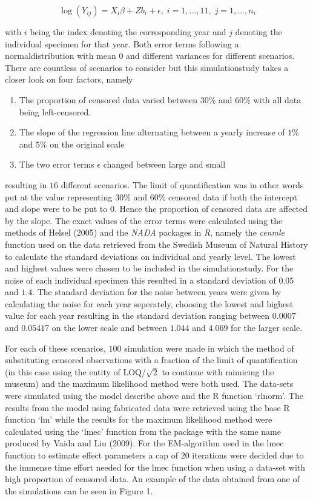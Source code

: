 \documentclass[]{article}
\providecommand{\tightlist}{%
  \setlength{\itemsep}{0pt}\setlength{\parskip}{0pt}}
\begin{document}
\[
\log(Y_{ij}) = X_{i}\beta + Zb_i + \epsilon, \; i=1,...,11, \; j= 1,...,n_i
\]

with \(i\) being the index denoting the corresponding year and \(j\)
denoting the individual specimen for that year. Both error terms
following a normaldistribution with mean \(0\) and different variances
for different scenarios. There are countless of scenarios to consider
but this simulationstudy takes a closer look on four factors, namely

\begin{enumerate}
\def\labelenumi{\arabic{enumi}.}
\tightlist
\item
  The proportion of censored data varied between \(30 \%\) and \(60 \%\)
  with all data being left-censored.
\item
  The slope of the regression line alternating between a yearly increase
  of \(1 \%\) and \(5 \%\) on the original scale
\item
  The two error terms \(\epsilon\) changed between large and small
\end{enumerate}

resulting in \(16\) different scenarios. The limit of quantification was
in other words put at the value representing \(30 \%\) and \(60 \%\)
censored data if both the intercept and slope were to be put to \(0\).
Hence the proportion of censored data are affected by the slope. The
exact values of the error terms were calculated using the methods of
Helsel (2005) and the \emph{NADA} packages in \emph{R}, namely the
\emph{cenmle} function used on the data retrieved from the Swedish
Museum of Natural History to calculate the standard deviations on
individual and yearly level. The lowest and highest values were chosen
to be included in the simulationstudy. For the noise of each individual
specimen this resulted in a standard deviation of \(0.05\) and \(1.4\).
The standard deviation for the noise between years were given by
calculating the noise for each year seperately, choosing the lowest and
highest value for each year resulting in the standard deviation ranging
between \(0.0007\) and \(0.05417\) on the lower scale and between
\(1.044\) and \(4.069\) for the larger scale.

For each of these scenarios, \(100\) simulation were made in which the
method of substituting censored observations with a fraction of the
limit of quantification (in this case using the entity of LOQ/\(\sqrt2\)
to continue with mimicing the museum) and the maximum likelihood method
were both used. The data-sets were simulated using the model describe
above and the R function `rlnorm'. The results from the model using
fabricated data were retrieved using the base R function `lm' while the
results for the maximum likelihood method were calculated using the
`lmec' function from the package with the same name produced by Vaida
and Liu (2009). For the EM-algorithm used in the lmec function to
estimate effect parameters a cap of \(20\) iterations were decided due
to the immense time effort needed for the lmec function when using a
data-set with high proportion of censored data. An example of the data
obtained from one of the simulations can be seen in Figure 1.
\end{document}
